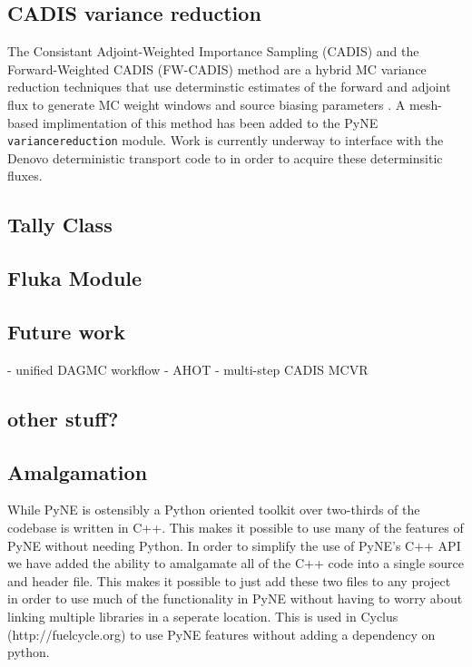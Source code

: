 \documentclass{anstrans}
\begin{document}

\subsection{CADIS variance reduction}

The Consistant Adjoint-Weighted Importance Sampling (CADIS) and the
Forward-Weighted CADIS (FW-CADIS) method are a hybrid MC variance reduction
techniques that use determinstic estimates of the forward and adjoint flux to
generate MC weight windows and source biasing parameters
\cite{haghighat_monte_2003}. A mesh-based implimentation of this method has
been added to the PyNE \texttt{variancereduction} module. Work is currently
underway to interface with the Denovo \cite{Denovo} deterministic transport
code to in order to acquire these determinsitic fluxes.


\subsection{Tally Class}

\subsection{Fluka Module}

\subsection{Future work}
- unified DAGMC workflow
- AHOT
- multi-step CADIS MCVR

\subsection{other stuff?}

\subsection{Amalgamation}

While PyNE is ostensibly a Python oriented toolkit over two-thirds of the codebase is written in C++. This makes it possible to use many of the features of PyNE without needing Python. In order to simplify the use of PyNE's C++ API we have added the ability to amalgamate all of the C++ code into a single source and header file. This makes it possible to just add these two files to any project in order to use much of the functionality in PyNE without having to worry about linking multiple libraries in a seperate location. This is used in Cyclus (http://fuelcycle.org) to use PyNE features without adding a dependency on python.
\end{document}
